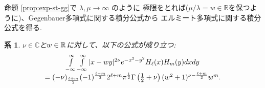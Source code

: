 \documentclass[pdf,notes]{beamer}
\newtheorem{cor}{系}
\begin{document}
\begin{frame}
	命題 \ref{prop:exp-st-gg}で $\lambda,\mu\to\infty$ のように
	極限をとれば($\mu/\lambda=w\in\mathbb{R}$を保つように)、Gegenbauer多項式に関する積分公式から
	エルミート多項式に関する積分公式を得る.
	\begin{cor}\label{cor:int-xzy-hh}
		$\nu\in\mathbb{C}$と$w\in\mathbb{R}$に対して、以下の公式が成り立つ:
		\begin{equation*}
			\begin{array}[]{c}
			\int_{- \infty}^{\infty} \int_{- \infty}^{\infty} | x - w y |^{2 \nu} e^{-
			x^2 - y^2} H_\ell (x) H_m (y) d x d y \\= (- \nu)_{\frac{\ell + m}{2}} (- 1)^{\frac{\ell
			- m}{2}} 2^{\ell + m} \pi^{\frac{1}{2}} \Gamma \left( \frac{1}{2} + \nu \right)
			(w^2 + 1)^{\nu - \frac{\ell + m}{2}} w^m .
			\end{array}
		\end{equation*}
	\end{cor}
\end{frame}
\end{document}
